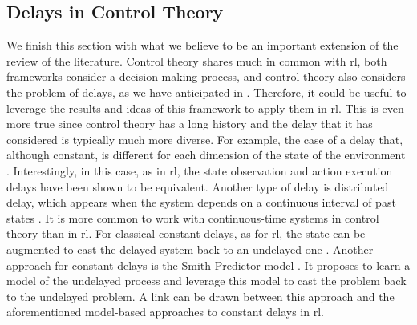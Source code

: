 \subsection{Delays in Control Theory}
\label{subsec:control_theory}
We finish this section with what we believe to be an important extension of the review of the literature. 
Control theory shares much in common with \gls{rl}, both frameworks consider a decision-making process, and control theory also considers the problem of delays, as we have anticipated in .
Therefore, it could be useful to leverage the results and ideas of this framework to apply them in \gls{rl}.
This is even more true since control theory has a long history and the delay that it has considered is typically much more diverse. 
For example, the case of a delay that, although constant, is different for each dimension of the state of the environment \cite{alevisakis1973extension, altman1999congestion}. 
Interestingly, in this case, as in \gls{rl}, the state observation and action execution delays have been shown to be equivalent.
Another type of delay is distributed delay, which appears when the system depends on a continuous interval of past states \cite{gu2003survey}. 
It is more common to work with continuous-time systems in control theory than in \gls{rl}.
For classical constant delays, as for \gls{rl}, the state can be augmented to cast the delayed system back to an undelayed one \cite{kwon2003simple}.
Another approach for constant delays is the Smith Predictor model \cite{smith1957closer}.
It proposes to learn a model of the undelayed process and leverage this model to cast the problem back to the undelayed problem. 
A link can be drawn between this approach and the aforementioned model-based approaches to constant delays in \gls{rl}.

